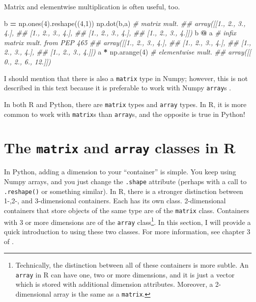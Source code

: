 \documentclass[
  12pt,
  krantz2]{krantz}
\makeatletter
\newenvironment{Shaded}{\begin{snugshade}}{\end{snugshade}}
\newcommand{\CommentTok}[1]{\textcolor[rgb]{0.37,0.37,0.37}{\textit{#1}}}
\newcommand{\DecValTok}[1]{\textcolor[rgb]{0.06,0.06,0.06}{#1}}
\newcommand{\NormalTok}[1]{#1}
\newcommand{\OperatorTok}[1]{\textcolor[rgb]{0.43,0.43,0.43}{\textbf{#1}}}
\newenvironment{kframe}{%
\medskip{}
\setlength{\fboxsep}{.8em}
 \def\at@end@of@kframe{}%
 \ifinner\ifhmode%
  \def\at@end@of@kframe{\end{minipage}}%
  \begin{minipage}{\columnwidth}%
 \fi\fi%
 \def\FrameCommand##1{\hskip\@totalleftmargin \hskip-\fboxsep
 \colorbox{shadecolor}{##1}\hskip-\fboxsep
     \hskip-\linewidth \hskip-\@totalleftmargin \hskip\columnwidth}%
 \MakeFramed {\advance\hsize-\width
   \@totalleftmargin\z@ \linewidth\hsize
   \@setminipage}}%
 {\par\unskip\endMakeFramed%
 \at@end@of@kframe}
\renewenvironment{Shaded}{\begin{kframe}}{\end{kframe}}
\makeatother
\begin{document}
Matrix and elementwise multiplication is often useful, too.

\begin{Shaded}
\begin{Highlighting}[]
\NormalTok{b }\OperatorTok{=}\NormalTok{ np.ones(}\DecValTok{4}\NormalTok{).reshape((}\DecValTok{4}\NormalTok{,}\DecValTok{1}\NormalTok{)) }
\NormalTok{np.dot(b,a) }\CommentTok{\# matrix mult.}
\CommentTok{\#\# array([[1., 2., 3., 4.],}
\CommentTok{\#\#        [1., 2., 3., 4.],}
\CommentTok{\#\#        [1., 2., 3., 4.],}
\CommentTok{\#\#        [1., 2., 3., 4.]])}
\NormalTok{b }\OperatorTok{@}\NormalTok{ a }\CommentTok{\# infix matrix mult. from PEP 465}
\CommentTok{\#\# array([[1., 2., 3., 4.],}
\CommentTok{\#\#        [1., 2., 3., 4.],}
\CommentTok{\#\#        [1., 2., 3., 4.],}
\CommentTok{\#\#        [1., 2., 3., 4.]])}
\NormalTok{a }\OperatorTok{*}\NormalTok{ np.arange(}\DecValTok{4}\NormalTok{) }\CommentTok{\# elementwise mult.}
\CommentTok{\#\# array([[ 0.,  2.,  6., 12.]])}
\end{Highlighting}
\end{Shaded}

I should mention that there is also a \texttt{matrix} type in Numpy; however, this is not described in this text because it is preferable to work with Numpy \texttt{array}s \citep{ml_with_python_cookbook}.

\begin{rmd-details}
In both R and Python, there are \texttt{matrix} types and \texttt{array} types. In R, it is more common to work with \texttt{matrix}s than \texttt{array}s, and the opposite is true in Python!

\end{rmd-details}

\hypertarget{the-matrix-and-array-classes-in-r}{%
\section{\texorpdfstring{The \texttt{matrix} and \texttt{array} classes in R}{The matrix and array classes in R}}\label{the-matrix-and-array-classes-in-r}}

In Python, adding a dimension to your ``container'' is simple. You keep using Numpy arrays, and you just change the \texttt{.shape} attribute (perhaps with a call to \texttt{.reshape()} or something similar). In R, there is a stronger distinction between 1-,2-, and 3-dimensional containers. Each has its own class. 2-dimensional containers that store objects of the same type are of the \texttt{matrix} class. Containers with 3 or more dimensions are of the \texttt{array} class\footnote{Technically, the distinction between all of these containers is more subtle. An \texttt{array} in R can have one, two or more dimensions, and it is just a vector which is stored with additional dimension attributes. Moreover, a 2-dimensional array is the same as a \texttt{matrix}.}. In this section, I will provide a quick introduction to using these two classes. For more information, see chapter 3 of \citep{matloff_r_book}.
\end{document}
